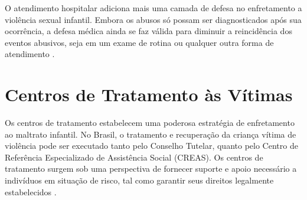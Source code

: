 O atendimento hospitalar adiciona mais uma camada de defesa no enfretamento a violência sexual infantil. Embora os abusos só possam ser diagnosticados após sua ocorrência, a defesa médica ainda se faz válida para diminuir a reincidência dos eventos abusivos, seja em um exame de rotina ou qualquer outra forma de atendimento \cite{costa2019maus}.







\section{Centros de Tratamento às Vítimas}\label{sec:centros}


Os centros de tratamento estabelecem uma poderosa estratégia de enfretamento ao maltrato infantil. No Brasil, o tratamento e recuperação da criança vítima de violência pode ser executado tanto pelo Conselho Tutelar, quanto pelo Centro de Referência Especializado de Assistência Social (CREAS). Os centros de tratamento surgem sob uma perspectiva de fornecer suporte e apoio necessário a indivíduos em situação de risco, tal como garantir seus direitos legalmente estabelecidos \cite{caccia2014conselheiros}.


